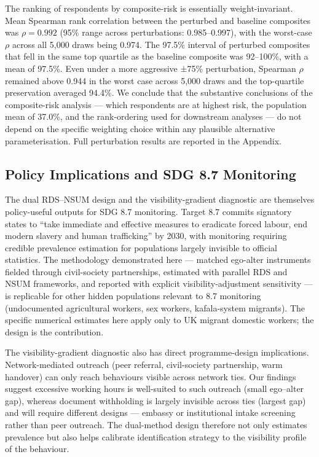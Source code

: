 \documentclass[
  12pt,
  letterpaper,
  DIV=11,
  numbers=noendperiod]{scrartcl}
\begin{document}
The ranking of respondents by composite-risk is essentially
weight-invariant. Mean Spearman rank correlation between the perturbed
and baseline composites was \(\rho = 0.992\) (95\% range across
perturbations: 0.985--0.997), with the worst-case \(\rho\) across all
5,000 draws being 0.974. The 97.5\% interval of perturbed composites
that fell in the same top quartile as the baseline composite was
92--100\%, with a mean of 97.5\%. Even under a more aggressive ±75\%
perturbation, Spearman \(\rho\) remained above 0.944 in the worst case
across 5,000 draws and the top-quartile preservation averaged 94.4\%. We
conclude that the substantive conclusions of the composite-risk analysis
--- which respondents are at highest risk, the population mean of
37.0\%, and the rank-ordering used for downstream analyses --- do not
depend on the specific weighting choice within any plausible alternative
parameterisation. Full perturbation results are reported in the
Appendix.

\subsection{Policy Implications and SDG 8.7
Monitoring}\label{sec-policy}

The dual RDS--NSUM design and the visibility-gradient diagnostic are
themselves policy-useful outputs for SDG 8.7 monitoring. Target 8.7
commits signatory states to ``take immediate and effective measures to
eradicate forced labour, end modern slavery and human trafficking'' by
2030, with monitoring requiring credible prevalence estimation for
populations largely invisible to official statistics. The methodology
demonstrated here --- matched ego-alter instruments fielded through
civil-society partnerships, estimated with parallel RDS and NSUM
frameworks, and reported with explicit visibility-adjustment sensitivity
--- is replicable for other hidden populations relevant to 8.7
monitoring (undocumented agricultural workers, sex workers,
kafala-system migrants). The specific numerical estimates here apply
only to UK migrant domestic workers; the design is the contribution.

The visibility-gradient diagnostic also has direct programme-design
implications. Network-mediated outreach (peer referral, civil-society
partnership, warm handover) can only reach behaviours visible across
network ties. Our findings suggest excessive working hours is
well-suited to such outreach (small ego--alter gap), whereas document
withholding is largely invisible across ties (largest gap) and will
require different designs --- embassy or institutional intake screening
rather than peer outreach. The dual-method design therefore not only
estimates prevalence but also helps calibrate identification strategy to
the visibility profile of the behaviour.
\end{document}
